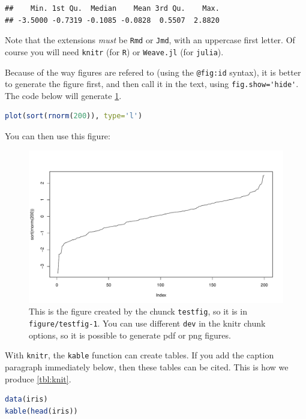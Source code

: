 \documentclass[12pt]{article}
\begin{document}
\begin{lstlisting}
##    Min. 1st Qu.  Median    Mean 3rd Qu.    Max. 
## -3.5000 -0.7319 -0.1085 -0.0828  0.5507  2.8820
\end{lstlisting}

Note that the extensions \emph{must} be \lstinline!Rmd! or
\lstinline!Jmd!, with an uppercase first letter. Of course you will need
\lstinline!knitr! (for \lstinline!R!) or \lstinline!Weave.jl! (for
\lstinline!julia!).

Because of the way figures are refered to (using the \lstinline!@fig:id!
syntax), it is better to generate the figure first, and then call it in
the text, using \lstinline!fig.show='hide'!. The code below will
generate \cref{fig:chunk}.

\begin{lstlisting}[language=R]
plot(sort(rnorm(200)), type='l')
\end{lstlisting}

You can then use this figure:

\begin{figure}[htbp]
\centering
\includegraphics[width=1.00000\textwidth]{figure/testfig-1.pdf}
\caption{This is the figure created by the chunck \lstinline!testfig!,
so it is in \lstinline!figure/testfig-1!. You can use different
\lstinline!dev! in the knitr chunk options, so it is possible to
generate pdf or png figures.\label{fig:chunk}}
\end{figure}

With \lstinline!knitr!, the \lstinline!kable! function can create
tables. If you add the caption paragraph immediately below, then these
tables can be cited. This is how we produce
\cref{tbl:knit}.

\begin{lstlisting}[language=R]
data(iris)
kable(head(iris))
\end{lstlisting}
\end{document}
